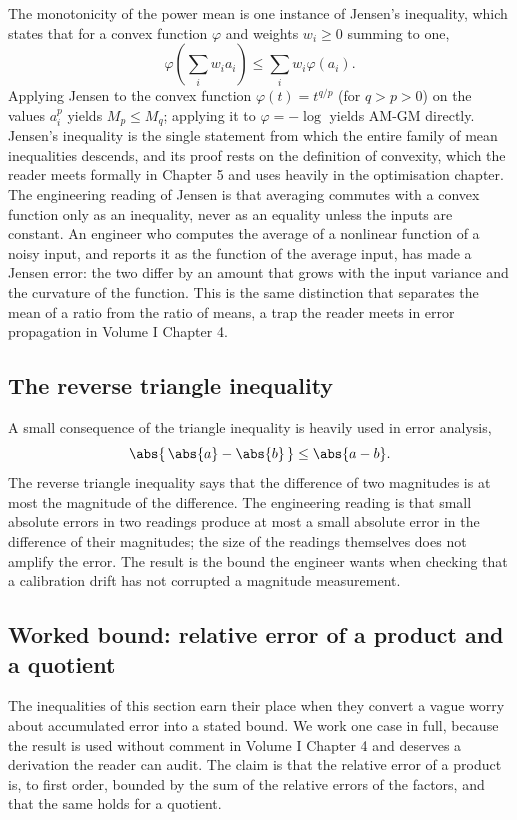 \begin{mastery}
The monotonicity of the power mean is one instance of Jensen's
inequality, which states that for a convex function $\varphi$ and
weights $w_{i} \geq 0$ summing to one,
\[
\varphi\!\left(\sum_{i} w_{i} a_{i}\right)
\leq \sum_{i} w_{i} \varphi(a_{i}).
\]
Applying Jensen to the convex function $\varphi(t) = t^{q/p}$ (for
$q > p > 0$) on the values $a_{i}^{p}$ yields $M_{p} \leq M_{q}$;
applying it to $\varphi = -\log$ yields AM-GM directly. Jensen's
inequality is the single statement from which the entire family of
mean inequalities descends, and its proof rests on the definition of
convexity, which the reader meets formally in Chapter 5 and uses
heavily in the optimisation chapter. The engineering reading of Jensen
is that averaging commutes with a convex function only as an
inequality, never as an equality unless the inputs are constant. An
engineer who computes the average of a nonlinear function of a noisy
input, and reports it as the function of the average input, has made a
Jensen error: the two differ by an amount that grows with the input
variance and the curvature of the function. This is the same
distinction that separates the mean of a ratio from the ratio of
means, a trap the reader meets in error propagation in Volume I
Chapter 4.
\end{mastery}

\subsection{The reverse triangle inequality}

A small consequence of the triangle inequality is heavily used in
error analysis,
\[
\abs{\,\abs{a} - \abs{b}\,} \leq \abs{a - b}.
\]
The reverse triangle inequality says that the difference of two
magnitudes is at most the magnitude of the difference. The
engineering reading is that small absolute errors in two readings
produce at most a small absolute error in the difference of their
magnitudes; the size of the readings themselves does not amplify
the error. The result is the bound the engineer wants when checking
that a calibration drift has not corrupted a magnitude measurement.

\subsection{Worked bound: relative error of a product and a quotient}

The inequalities of this section earn their place when they convert a
vague worry about accumulated error into a stated bound. We work one
case in full, because the result is used without comment in Volume I
Chapter 4 and deserves a derivation the reader can audit. The claim is
that the relative error of a product is, to first order, bounded by the
sum of the relative errors of the factors, and that the same holds for a
quotient.

